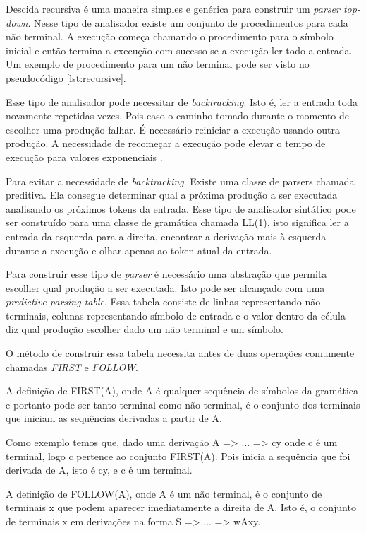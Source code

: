 Descida recursiva é uma maneira simples e genérica para construir um \textit{parser top-down}.
Nesse tipo de analisador existe um conjunto de procedimentos para cada não terminal. A execução
começa chamando o procedimento para o símbolo inicial e então termina a execução com sucesso
se a execução ler todo a entrada. Um exemplo de procedimento para um não terminal pode ser
visto no pseudocódigo \ref{lst:recursive}.

Esse tipo de analisador pode necessitar de \textit{backtracking}. Isto é, ler a entrada toda
novamente repetidas vezes. Pois caso o caminho tomado durante o momento de escolher uma produção falhar.
É necessário reiniciar a execução usando outra produção. A necessidade de recomeçar a execução
pode elevar o tempo de execução para valores exponenciais \cite{aho2006}. 

Para evitar a necessidade de \textit{backtracking}. Existe uma classe de parsers chamada preditiva.
Ela consegue determinar qual a próxima produção a ser executada analisando os próximos tokens da entrada.
Esse tipo de analisador sintático pode ser construído para uma classe de gramática chamada LL(1), isto significa
ler a entrada da esquerda para a direita, encontrar a derivação mais à esquerda durante a execução e olhar 
apenas ao token atual da entrada.

Para construir esse tipo de \textit{parser} é necessário uma abstração que permita escolher qual produção
a ser executada. Isto pode ser alcançado com uma \textit{predictive parsing table}. Essa tabela consiste
de linhas representando não terminais, colunas representando símbolo de entrada e o valor
dentro da célula diz qual produção escolher dado um não terminal e um símbolo.

O método de construir essa tabela necessita antes de duas operações comumente chamadas \textit{FIRST} e 
\textit{FOLLOW}.

A definição de FIRST(A), onde A é qualquer sequência de símbolos da gramática e portanto pode 
ser tanto terminal como não terminal, é o conjunto dos terminais que iniciam as 
sequências derivadas a partir de A. 

Como exemplo temos que, dado uma derivação A => ... => cy onde c é um terminal, 
logo c pertence ao conjunto FIRST(A). Pois inicia a sequência que foi derivada de A, isto é cy, 
e c é um terminal.

A definição de FOLLOW(A), onde A é um não terminal, é o conjunto de terminais x que podem aparecer imediatamente
a direita de A. Isto é, o conjunto de terminais x em derivações na forma S => ... => wAxy.

